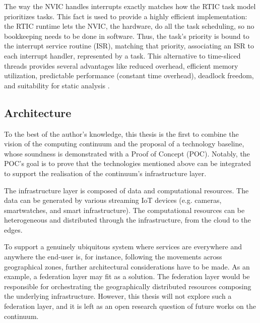The way the NVIC handles interrupts \cite{interrupts-handling} exactly matches how the RTIC task model prioritizes tasks. This fact is used to provide a highly efficient implementation: the RTIC runtime lets the NVIC, the hardware, do all the task scheduling, so no bookkeeping needs to be done in software. Thus, the task's priority is bound to the interrupt service routine (ISR), matching that priority, associating an ISR to each interrupt handler, represented by a task. This alternative to time-sliced threads provides several advantages like reduced overhead, efficient memory utilization, predictable performance (constant time overhead), deadlock freedom, and suitability for static analysis \cite{eriksson2013real}.

\subsection{Architecture}

To the best of the author's knowledge, this thesis is the first to combine the vision of the computing continuum and the proposal of a technology baseline, whose soundness is demonstrated with a Proof of Concept (POC). Notably, the POC's goal is to prove that the technologies mentioned above can be integrated to support the realisation of the continuum's infrastructure layer. 

The infrastructure layer is composed of data and computational resources. The data can be generated by various streaming IoT devices (e.g. cameras, smartwatches, and smart infrastructure). The computational resources can be heterogeneous and distributed through the infrastructure, from the cloud to the edges.

To support a genuinely ubiquitous system where services are everywhere and anywhere the end-user is, for instance, following the movements across geographical zones, further architectural considerations have to be made. As an example, a federation layer may fit as a solution. The federation layer would be responsible for orchestrating the geographically distributed resources composing the underlying infrastructure. However, this thesis will not explore such a federation layer, and it is left as an open research question of future works on the continuum.

